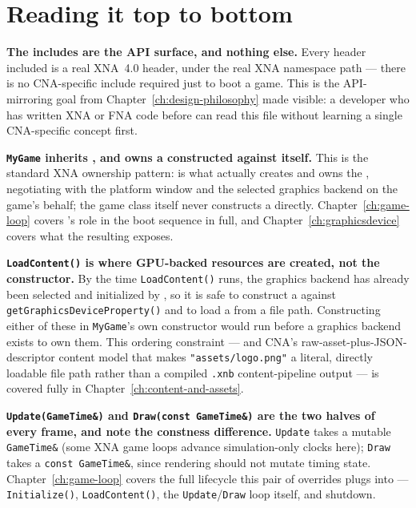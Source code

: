 \section{Reading it top to bottom}

\textbf{The includes are the API surface, and nothing else.} Every header included is a real
XNA~4.0 header, under the real XNA namespace path --- there is no CNA-specific include
required just to boot a game. This is the API-mirroring goal from
Chapter~\ref{ch:design-philosophy} made visible: a developer who has written XNA or FNA code
before can read this file without learning a single CNA-specific concept first.

\textbf{\texttt{MyGame} inherits , and owns a
 constructed against itself.} This is the standard XNA
ownership pattern:  is what actually creates and owns the
, negotiating with the platform window and the selected graphics
backend on the game's behalf; the game class itself never constructs a
 directly. Chapter~\ref{ch:game-loop} covers
's role in the boot sequence in full, and
Chapter~\ref{ch:graphicsdevice} covers what the resulting  exposes.

\textbf{\texttt{LoadContent()} is where GPU-backed resources are created, not the
constructor.} By the time \texttt{LoadContent()} runs, the graphics backend has already been
selected and initialized by , so it is safe to construct a
 against \texttt{getGraphicsDeviceProperty()} and to load a
 from a file path. Constructing either of these in \texttt{MyGame}'s own
constructor would run before a graphics backend exists to own them. This ordering
constraint --- and CNA's raw-asset-plus-JSON-descriptor content model that makes
\texttt{"assets/logo.png"} a literal, directly loadable file path rather than a compiled
\texttt{.xnb} content-pipeline output --- is covered fully in
Chapter~\ref{ch:content-and-assets}.

\textbf{\texttt{Update(GameTime\&)} and \texttt{Draw(const GameTime\&)} are the two halves of
every frame, and note the constness difference.} \texttt{Update} takes a mutable
\texttt{GameTime\&} (some XNA game loops advance simulation-only clocks here);
\texttt{Draw} takes a \texttt{const GameTime\&}, since rendering should not mutate timing
state. Chapter~\ref{ch:game-loop} covers the full  lifecycle this pair of
overrides plugs into --- \texttt{Initialize()}, \texttt{LoadContent()}, the
\texttt{Update}/\texttt{Draw} loop itself, and shutdown.

